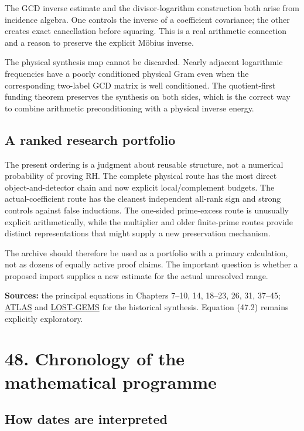\documentclass[
  10pt,
  a4paper,
  10pt,
  oneside,
  openany]{book}
\begin{document}
The GCD inverse estimate and the divisor-logarithm construction both
arise from incidence algebra. One controls the inverse of a coefficient
covariance; the other creates exact cancellation before squaring. This
is a real arithmetic connection and a reason to preserve the explicit
Möbius inverse.

The physical synthesis map cannot be discarded. Nearly adjacent
logarithmic frequencies have a poorly conditioned physical Gram even
when the corresponding two-label GCD matrix is well conditioned. The
quotient-first funding theorem preserves the synthesis on both sides,
which is the correct way to combine arithmetic preconditioning with a
physical inverse energy.

\subsection{A ranked research
portfolio}\label{a-ranked-research-portfolio}

The present ordering is a judgment about reusable structure, not a
numerical probability of proving RH. The complete physical route has the
most direct object-and-detector chain and now explicit local/complement
budgets. The actual-coefficient route has the cleanest independent
all-rank sign and strong controls against false inductions. The
one-sided prime-excess route is unusually explicit arithmetically, while
the multiplier and older finite-prime routes provide distinct
representations that might supply a new preservation mechanism.

The archive should therefore be used as a portfolio with a primary
calculation, not as dozens of equally active proof claims. The important
question is whether a proposed import supplies a new estimate for the
actual unresolved range.

\textbf{Sources:} the principal equations in Chapters 7--10, 14, 18--23,
26, 31, 37--45; \hyperref[source-atlas]{ATLAS} and
\hyperref[source-lost-gems]{LOST-GEMS} for the historical synthesis.
Equation (47.2) remains explicitly exploratory.

\section{48. Chronology of the mathematical
programme}\label{ch-chronology}

\subsection{How dates are interpreted}\label{how-dates-are-interpreted}
\end{document}
